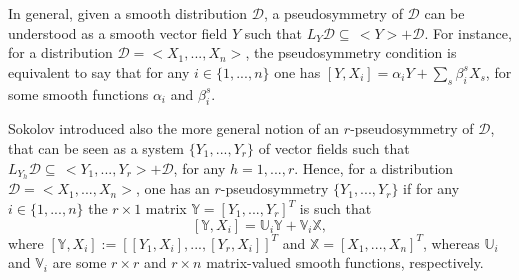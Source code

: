 \documentclass[12pt,english]{elsarticle}
\theoremstyle{plain}
\theoremstyle{plain}
\theoremstyle{remark}
\theoremstyle{plain}
\theoremstyle{definition}
\theoremstyle{definition}
\begin{document}
In general, given a smooth distribution $\mathcal{D}$, a pseudosymmetry
of $\mathcal{D}$ can be understood as a smooth vector field $Y$ such that
$L_{Y}\mathcal{D}\subseteq \,<Y>+\mathcal{D}$. For instance, for a distribution
$\mathcal{D}=<X_{1},...,X_{n}>$, the pseudosymmetry condition is equivalent
to say that for any $i\in \{1,...,n\}$ one has
$[Y,X_{i}]=\alpha _{i}Y+\sum _{s}\beta _{i}^{s}X_{s}$, for some smooth
functions $\alpha _{i}$ and $\beta _{i}^{s}$.

Sokolov introduced also the more general notion of an $r$-pseudosymmetry
of $\mathcal{D}$, that can be seen as a system $\{Y_{1},...,Y_{r}\}$ of
vector fields such that
$L_{Y_{h}}\mathcal{D}\subseteq \,<Y_{1},...,Y_{r}>+\mathcal{D}$, for any
$h=1,...,r$. Hence, for a distribution
$\mathcal{D}=<X_{1},...,X_{n}>$, one has an $r$-pseudosymmetry
$\{Y_{1},...,Y_{r}\}$ if for any $i\in \{1,...,n\}$ the $r\times 1$ matrix
$\mathbb{Y}=\left [Y_{1},...,Y_{r}\right ]^{T}$ is such that
%
\begin{equation}
\left [\mathbb{Y},X_{i}\right ]=\mathbb{U}_{i}\mathbb{Y}+\mathbb{V}_{i}
\mathbb{X},
\label{eq:multi_pseudosim}
\end{equation}
%
where
$\left [\mathbb{Y},X_{i}\right ]:=\left [\left [Y_{1},X_{i}\right ],...,
\left [Y_{r},X_{i}\right ]\right ]^{T}$ and
$\mathbb{X}=\left [X_{1},...,X_{n}\right ]^{T}$, whereas
$\mathbb{U}_{i}$ and $\mathbb{V}_{i}$ are some $r\times r$ and
$r\times n$ matrix-valued smooth functions, respectively.
\end{document}
